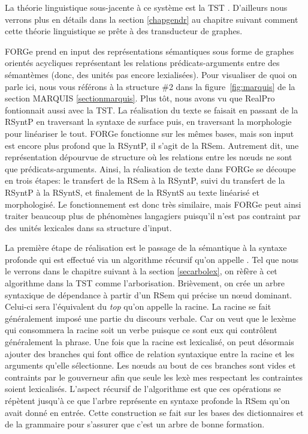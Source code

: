 La théorie linguistique sous-jacente à ce système est la \ac{TST} \citep{melcuk1988, mel2012semantics, PolgueretheorieSensTexte1998, kahane05a, Milicevic2007ASG}. D'ailleurs nous verrons plus en détails dans la section \ref{chapgendr} au chapitre suivant comment cette théorie linguistique se prête à des transducteur de graphes.

FORGe prend en input des représentations sémantiques sous forme de graphes orientés acycliques représentant les relations prédicats-arguments entre des sémantèmes (donc, des unités pas encore lexialisées). Pour visualiser de quoi on parle ici, nous vous référons à la structure \#2 dans la figure~\ref{fig:marquis} de la section MARQUIS \ref{sectionmarquis}. Plus tôt, nous avons vu que RealPro fontionnait aussi avec la \ac{TST}. La réalisation du texte se faisait en passant de la \ac{RSyntP} en traversant la syntaxe de surface puis, en traversant la morphologie pour linéariser le tout. FORGe fonctionne sur les mêmes bases, mais son input est encore plus profond que la \ac{RSyntP}, il s'agit de la \ac{RSem}. Autrement dit, une représentation dépourvue de structure où les relations entre les n\oe{}uds ne sont que prédicats-arguments. Ainsi, la réalisation de texte dans FORGe se découpe en trois étapes: le transfert de la \ac{RSem} à la \ac{RSyntP}, suivi du transfert de la \ac{RSyntP} à la \ac{RSyntS}, et finalement de la \ac{RSyntS} au texte linéarisé et morphologisé. Le fonctionnement est donc très similaire, mais FORGe peut ainsi traiter beaucoup plus de phénomènes langagiers puisqu'il n'est pas contraint par des unités lexicales dans sa structure d'input.

La première étape de réalisation est le passage de la sémantique à la syntaxe profonde qui est effectué via un algorithme récursif qu'on appelle . Tel que nous le verrons dans le chapitre suivant à la section \ref{secarbolex}, on rèfère à cet algorithme dans la \ac{TST} comme l'arborisation. Brièvement, on crée un arbre syntaxique de dépendance à partir d'un \ac{RSem} qui précise un n\oe{}ud dominant. Celui-ci sera l'équivalent du \emph{top} qu'on appelle la racine. La racine se fait généralement imposé une partie du discours verbale. Car on veut que le lexème qui consommera la racine soit un verbe puisque ce sont eux qui contrôlent généralement la phrase. Une fois que la racine est lexicalisé, on peut désormais ajouter des branches qui font office de relation syntaxique entre la racine et les arguments qu'elle sélectionne. Les n\oe{}uds au bout de ces branches sont vides et contraints par le gouverneur afin que seule les lexè
mes respectant les contraintes soient lexicalisés. L'aspect récursif de l'algorithme est que ces opérations se répètent jusqu'à ce que l'arbre représente en syntaxe profonde la \ac{RSem} qu'on avait donné en entrée. Cette construction se fait sur les bases des dictionnaires et de la grammaire pour s'assurer que c'est un arbre de bonne formation.

